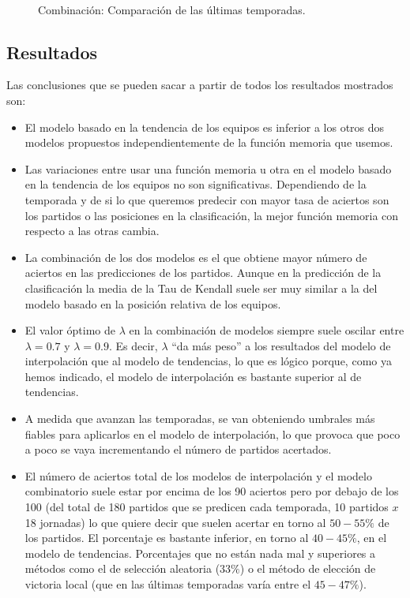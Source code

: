 \begin{figure}[H]
	\centering
	\\
	\caption{Combinación: Comparación de las últimas temporadas.}
\end{figure} 

\newpage
\subsection{Resultados}
Las conclusiones que se pueden sacar a partir de todos los resultados mostrados son:
\begin{itemize}
	\item El modelo basado en la tendencia de los equipos es inferior a los otros dos modelos propuestos independientemente de la función memoria que usemos. 
	\item Las variaciones entre usar una función memoria u otra en el modelo basado en la tendencia de los equipos no son significativas. Dependiendo de la temporada y de si lo que queremos predecir con mayor tasa de aciertos son los partidos o las posiciones en la clasificación, la mejor función memoria con respecto a las otras cambia.  
	\item La combinación de los dos modelos es el que obtiene mayor número de aciertos en las predicciones de los partidos. Aunque en la predicción de la clasificación la media de la Tau de Kendall suele ser muy similar a la del modelo basado en la posición relativa de los equipos.
	\item El valor óptimo de $\lambda$ en la combinación de modelos siempre suele oscilar entre $\lambda=0.7$ y $\lambda=0.9$. Es decir, $\lambda$ ``da más peso'' a los resultados del modelo de interpolación que al modelo de tendencias, lo que es lógico porque, como ya hemos indicado, el modelo de interpolación es bastante superior al de tendencias.
	\item A medida que avanzan las temporadas, se van obteniendo umbrales más fiables para aplicarlos en el modelo de interpolación, lo que provoca que poco a poco se vaya incrementando el número de partidos acertados.
	\item El número de aciertos total de los modelos de interpolación y el modelo combinatorio suele estar por encima de los 90 aciertos pero por debajo de los 100 (del total de 180 partidos que se predicen cada temporada, 10 partidos $x$ 18 jornadas) lo que quiere decir que suelen acertar en torno al $50-55\%$ de los partidos. El porcentaje es bastante inferior, en torno al $40-45\%$, en el modelo de tendencias. Porcentajes que no están nada mal y superiores a métodos como el de selección aleatoria ($33\%$) o el método de elección de victoria local (que en las últimas temporadas varía entre el $45-47\%$).

\end{itemize}
